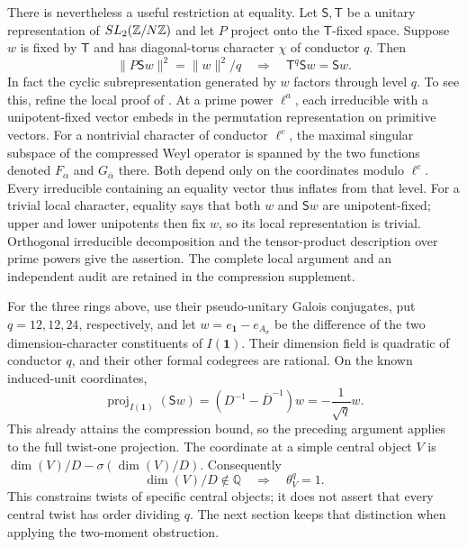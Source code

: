 There is nevertheless a useful restriction at equality. Let
$\mathsf S,\mathsf T$ be a unitary representation of
$SL_2(\mathbb Z/N\mathbb Z)$ and let $P$ project onto the $\mathsf T$-fixed space.
Suppose $w$ is fixed by $\mathsf T$ and has diagonal-torus character
$\chi$ of conductor $q$. Then
\[
 \|P\mathsf S w\|^2=\|w\|^2/q
 \quad\Longrightarrow\quad
 \mathsf T^q\mathsf S w=\mathsf S w.
\]
In fact the cyclic subrepresentation generated by $w$ factors through
level $q$. To see this, refine the local proof of
\cite[Lemma~4.1]{SchopierayDimensionBlock}. At a prime power $\ell^a$,
each irreducible with a unipotent-fixed vector embeds in the permutation
representation on primitive vectors. For a nontrivial character of
conductor $\ell^c$, the maximal singular subspace of the compressed
Weyl operator is spanned by the two functions denoted $F_\alpha$ and
$G_{\overline\alpha}$ there. Both depend only on the coordinates
modulo $\ell^c$. Every irreducible containing an equality vector thus
inflates from that level. For a trivial local character, equality says
that both $w$ and $\mathsf S w$ are unipotent-fixed; upper and lower
unipotents then fix $w$, so its local representation is trivial.
Orthogonal irreducible decomposition and the tensor-product description
over prime powers give the assertion. The complete local argument and
an independent audit are retained in the compression supplement.

For the three rings above, use their pseudo-unitary Galois conjugates,
put $q=12,12,24$, respectively, and let
$w=e_{\mathbf1}-e_{A_\sigma}$ be the difference of the two
dimension-character constituents of $I(\mathbf1)$. Their dimension
field is quadratic of conductor $q$, and their other formal codegrees
are rational. On the known induced-unit coordinates,
\[
 \operatorname{proj}_{I(\mathbf1)}(\mathsf S w)
 =\left(D^{-1}-\overline D^{-1}\right)w
 =-\frac{1}{\sqrt q}w.
\]
This already attains the compression bound, so the preceding argument
applies to the full twist-one projection. The coordinate at a simple
central object $V$ is
$\dim(V)/D-\sigma(\dim(V)/D)$. Consequently
\[
 \dim(V)/D\notin\mathbb Q
 \quad\Longrightarrow\quad \theta_V^q=1.
\]
This constrains twists of specific central objects; it does not assert
that every central twist has order dividing $q$. The next section keeps
that distinction when applying the two-moment obstruction.
